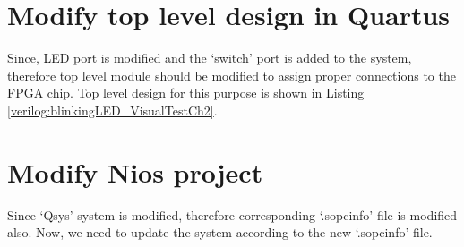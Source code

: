 \section{Modify top level design in Quartus}
Since, LED port is modified and the `switch' port is added to the system, therefore top level module should be modified to assign proper connections to the FPGA chip. Top level design for this purpose is shown in Listing \ref{verilog:blinkingLED_VisualTestCh2}.


\section{Modify  Nios project}
Since `Qsys' system is modified, therefore corresponding `.sopcinfo' file is modified also. Now, we need to update the system according to the new `.sopcinfo' file. 

